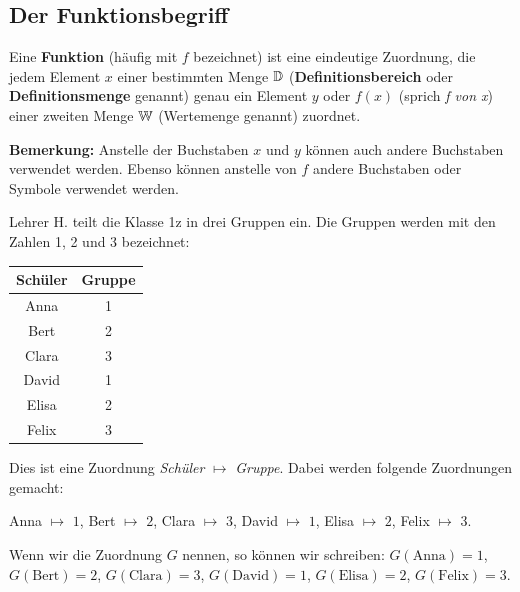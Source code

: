 \subsection{Der Funktionsbegriff}
\begin{deff}[Funktion]{}
    Eine \textbf{Funktion} (häufig mit $f$ bezeichnet) ist eine eindeutige Zuordnung, die jedem Element $x$ einer bestimmten Menge $\operatorname{\mathbb{D}}$ (\textbf{Definitionsbereich} oder \textbf{Definitionsmenge} genannt) genau ein Element $y$ oder $f(x)$ (sprich \textit{f von x}) einer zweiten Menge $\operatorname{\mathbb{W}}$ (Wertemenge genannt) zuordnet.
\end{deff}
\textbf{Bemerkung:} Anstelle der Buchstaben $x$ und $y$ können auch andere Buchstaben verwendet werden. Ebenso können anstelle von $f$ andere Buchstaben oder Symbole verwendet werden.
\begin{example}
    Lehrer H. teilt die Klasse 1z in drei Gruppen ein. Die Gruppen werden mit den Zahlen 1, 2 und 3 bezeichnet:
    \smallskip

    \begin{minipage}{0.4\textwidth}
        \begin{tabular}{c|c}
            Schüler & Gruppe \\
            \hline
            Anna    & 1      \\
            Bert    & 2      \\
            Clara   & 3      \\
            David   & 1      \\
            Elisa   & 2      \\
            Felix   & 3
        \end{tabular}
    \end{minipage}
    \begin{minipage}{0.6\textwidth}
        Dies ist eine Zuordnung \textit{Schüler} $\mapsto$ \textit{Gruppe}. Dabei werden folgende Zuordnungen gemacht:

        Anna $\mapsto$ $1$, Bert $\mapsto$ $2$, Clara $\mapsto$ $3$, David $\mapsto$ $1$, Elisa $\mapsto$ $2$, Felix $\mapsto$ $3$.
        \vspace{0.5cm}

        Wenn wir die Zuordnung $G$ nennen, so können wir schreiben: $G(\text{Anna})=1$, $G(\text{Bert})=2$, $G(\text{Clara})=3$, $G(\text{David})=1$, $G(\text{Elisa})=2$, $G(\text{Felix})=3$.
    \end{minipage}
\end{example}

